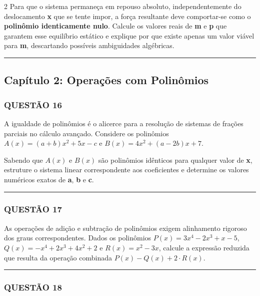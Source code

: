 \documentclass[11pt, a4paper]{article}
\begin{document}
\begin{multicols*}{2}
Para que o sistema permaneça em repouso absoluto, independentemente do deslocamento \textbf{x} que se tente impor, a força resultante deve comportar-se como o \textbf{polinômio identicamente nulo}. Calcule os valores reais de \textbf{m} e \textbf{p} que garantem esse equilíbrio estático e explique por que existe apenas um valor viável para \textbf{m}, descartando possíveis ambiguidades algébricas.

\vspace{0cm} \noindent\textcolor{CorLinha}{\rule{\linewidth}{0.5pt}} \vspace{-0.2cm}
\subsection*{Capítulo 2: Operações com Polinômios}
\subsubsection*{QUESTÃO 16}

A igualdade de polinômios é o alicerce para a resolução de sistemas de frações parciais no cálculo avançado. Considere os polinômios $ A(x) = (a + b)x^2 + 5x - c $ e $ B(x) = 4x^2 + (a - 2b)x + 7 $.

Sabendo que $ A(x) $ e $ B(x) $ são polinômios idênticos para qualquer valor de \textbf{x}, estruture o sistema linear correspondente aos coeficientes e determine os valores numéricos exatos de \textbf{a}, \textbf{b} e \textbf{c}.

\vspace{0cm} \noindent\textcolor{CorLinha}{\rule{\linewidth}{0.5pt}} \vspace{-0.2cm}
\subsubsection*{QUESTÃO 17}

As operações de adição e subtração de polinômios exigem alinhamento rigoroso dos graus correspondentes. Dados os polinômios $ P(x) = 3x^4 - 2x^3 + x - 5 $, $ Q(x) = -x^4 + 2x^3 + 4x^2 + 2 $ e $ R(x) = x^2 - 3x $, calcule a expressão reduzida que resulta da operação combinada $ P(x) - Q(x) + 2 \cdot R(x) $.

\vspace{0cm} \noindent\textcolor{CorLinha}{\rule{\linewidth}{0.5pt}} \vspace{-0.2cm}
\subsubsection*{QUESTÃO 18}


\end{multicols*}
\end{document}
